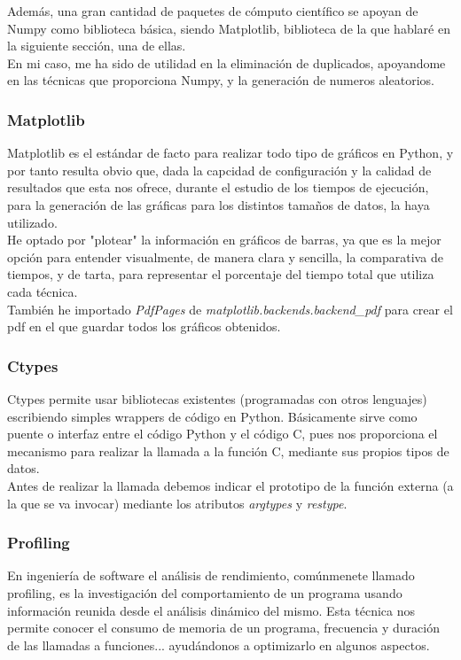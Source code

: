 \documentclass[12 pt]{article}
\begin{document}
Además, una gran cantidad de paquetes de cómputo científico se apoyan de Numpy como biblioteca básica, siendo Matplotlib, biblioteca de la que hablaré en la siguiente sección, una de ellas.\\

En mi caso, me ha sido de utilidad en la eliminación de duplicados, apoyandome en las técnicas que proporciona Numpy, y la generación de numeros aleatorios.
\subsubsection{Matplotlib}
Matplotlib es el estándar de facto para realizar todo tipo de gráficos en Python, y por tanto resulta obvio que, dada la capcidad de configuración y la calidad de resultados que esta nos ofrece, durante el estudio de los tiempos de ejecución, para la generación de las gráficas para los distintos tamaños de datos, la haya utilizado.\\

He optado por "plotear" la información en gráficos de barras, ya que es la mejor opción para entender visualmente, de manera clara y sencilla, la comparativa de tiempos, y de tarta, para representar el porcentaje del tiempo total que utiliza cada técnica.\\

También he importado \emph{PdfPages} de \emph{matplotlib.backends.backend\_pdf} para crear el pdf en el que guardar todos los gráficos obtenidos.

\subsubsection{Ctypes}
Ctypes permite usar bibliotecas existentes (programadas con otros lenguajes) escribiendo simples wrappers de código en Python. Básicamente sirve como puente o interfaz entre el código Python y el código C, pues nos proporciona el mecanismo para realizar la llamada a la función C, mediante sus propios tipos de datos.\\

Antes de realizar la llamada debemos indicar el prototipo de la función externa (a la que se va invocar) mediante los atributos \emph{argtypes} y \emph{restype}.

\newpage 

\subsubsection{Profiling}
En ingeniería de software el análisis de rendimiento, comúnmenete llamado profiling, es la investigación del comportamiento de un programa usando información reunida desde el análisis dinámico del mismo. Esta técnica nos permite conocer el consumo de memoria de un programa, frecuencia y duración de las llamadas a funciones... ayudándonos a optimizarlo en algunos aspectos.\\
\end{document}
